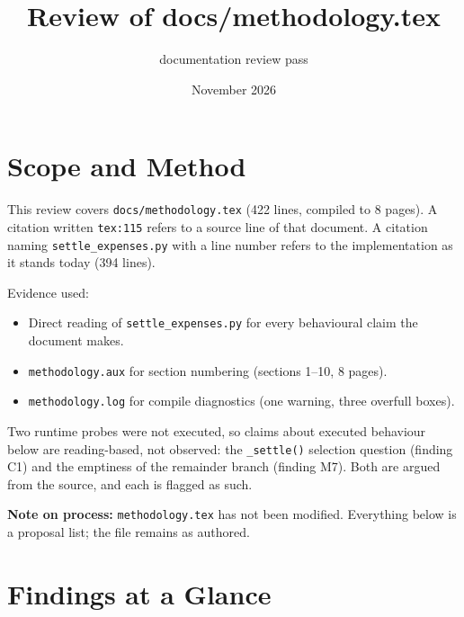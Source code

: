 \documentclass[11pt]{article}
\title{Review of docs/methodology.tex}
\author{documentation review pass}
\date{November 2026}
\begin{document}
\maketitle

\section{Scope and Method}

This review covers \texttt{docs/methodology.tex} (422 lines, compiled to 8 pages). A citation written
\texttt{tex:115} refers to a source line of that document. A citation naming
\texttt{settle\_expenses.py} with a line number refers to the implementation as it stands today (394
lines).

Evidence used:

\begin{itemize}
  \item Direct reading of \texttt{settle\_expenses.py} for every behavioural claim the document makes.
  \item \texttt{methodology.aux} for section numbering (sections 1--10, 8 pages).
  \item \texttt{methodology.log} for compile diagnostics (one warning, three overfull boxes).
\end{itemize}

Two runtime probes were not executed, so claims about executed behaviour below are reading-based, not
observed: the \texttt{\_settle()} selection question (finding C1) and the emptiness of the remainder
branch (finding M7). Both are argued from the source, and each is flagged as such.

\textbf{Note on process:} \texttt{methodology.tex} has not been modified. Everything below is a proposal
list; the file remains as authored.

\section{Findings at a Glance}
\end{document}
